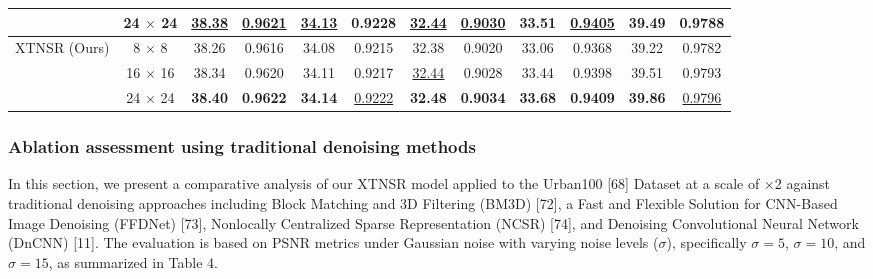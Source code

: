 \documentclass[twocolumn]{svjour3}          %
\begin{document}
\begin{table}
\begin{tabular}{|c|c|cc|cc|cc|cc|cc|}
            & {24 $\times$ 24} & \multicolumn{1}{c|}{\color{blue}\underline{38.38}} &{\color{blue}\underline{0.9621}}  & \multicolumn{1}{c|}{\color{blue}\underline{34.13}} &{\color{red}\textbf{0.9228}} & \multicolumn{1}{c|}{\color{blue}\underline{32.44}} &{\color{blue}\underline{0.9030}} & \multicolumn{1}{c|}{33.51} &{\color{blue}\underline{0.9405}}  & \multicolumn{1}{c|}{39.49} &{0.9788}  \\
  \hline
  \multirow{3}{*}{XTNSR (Ours)} & {8 $\times$ 8}  & \multicolumn{1}{c|}{38.26} &{0.9616}  & \multicolumn{1}{c|}{34.08} &{0.9215} & \multicolumn{1}{c|}{32.38} &{0.9020} & \multicolumn{1}{c|}{33.06} &{0.9368}  & \multicolumn{1}{c|}{39.22} &{0.9782} \\
            & {16 $\times$ 16}   & \multicolumn{1}{c|}{38.34} &{0.9620}  & \multicolumn{1}{c|}{34.11} &{0.9217} & \multicolumn{1}{c|}{\color{blue}\underline{32.44}} &{0.9028} & \multicolumn{1}{c|}{33.44} &{0.9398}  & \multicolumn{1}{c|}{39.51} &{0.9793} \\
            & {24 $\times$ 24} & \multicolumn{1}{c|}{\color{red}\textbf{38.40}} &{\color{red}\textbf{0.9622}}  & \multicolumn{1}{c|}{\color{red}\textbf{34.14}} &{\color{blue}\underline{0.9222}} & \multicolumn{1}{c|}{\color{red}\textbf{32.48}} &{\color{red}\textbf{0.9034}} & \multicolumn{1}{c|}{\color{red}\textbf{33.68}} &{\color{red}\textbf{0.9409}}  & \multicolumn{1}{c|}{\color{red}\textbf{39.86}} &{\color{blue}\underline{0.9796}}  \\
  \hline
\end{tabular}
\end{table}

\subsubsection{Ablation assessment using traditional denoising methods}

In this section, we present a comparative analysis of our XTNSR model applied to the Urban100 [68] Dataset at a scale of ×2 against traditional denoising approaches including Block Matching and 3D Filtering (BM3D) [72], a Fast and Flexible Solution for CNN-Based Image Denoising (FFDNet) [73], Nonlocally Centralized Sparse Representation (NCSR) [74], and Denoising Convolutional Neural Network (DnCNN) [11]. The evaluation is based on PSNR metrics under Gaussian noise with varying noise levels ($\sigma$), specifically $\sigma = 5$, $\sigma = 10$, and $\sigma = 15$, as summarized in Table 4.
\end{document}
